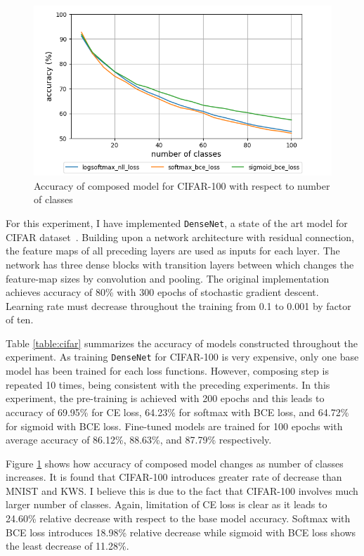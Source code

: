 \documentclass{article}
\begin{document}
\begin{figure}[t]
    \centering
    \includegraphics[scale=0.5,trim={0mm 0mm 0mm 0mm},clip]{cifar100.png}
    \caption{Accuracy of composed model for CIFAR-100 with respect to number of classes}
    \label{figure:composed_cifar}
\end{figure}


For this experiment, I have implemented \texttt{DenseNet}, a state of the art model for CIFAR dataset~\cite{huang2017densely}. Building upon a network architecture with residual connection, the feature maps of all preceding layers are used as inputs for each layer. The network has three dense blocks with transition layers between which changes the feature-map sizes by convolution and pooling. The original implementation achieves accuracy of 80\% with 300 epochs of stochastic gradient descent. Learning rate must decrease throughout the training from 0.1 to 0.001 by factor of ten.

Table \ref{table:cifar} summarizes the accuracy of models constructed throughout the experiment. As training \texttt{DenseNet} for CIFAR-100 is very expensive, only one base model has been trained for each loss functions. However, composing step is repeated 10 times, being consistent with the preceding experiments. In this experiment, the pre-training is achieved with 200 epochs and this leads to accuracy of 69.95\% for CE loss, 64.23\% for softmax with BCE loss, and 64.72\% for sigmoid with BCE loss. Fine-tuned models are trained for 100 epochs with average accuracy of 86.12\%, 88.63\%, and 87.79\% respectively.


Figure \ref{figure:composed_cifar} shows how accuracy of composed model changes as number of classes increases. It is found that CIFAR-100 introduces greater rate of decrease than MNIST and KWS. I believe this is due to the fact that CIFAR-100 involves much larger number of classes. Again, limitation of CE loss is clear as it leads to 24.60\% relative decrease with respect to the base model accuracy. Softmax with BCE loss introduces 18.98\% relative decrease while sigmoid with BCE loss shows the least decrease of 11.28\%.
\end{document}
